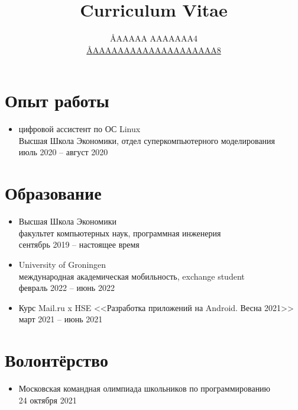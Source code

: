 \documentclass[12pt]{article}
\title{Curriculum Vitae}
\author{\AA{AAAAA AAAAAAA}{4} \\ \href{mailto:\AA{AAAAAAAAAAAAAAAAAAAA}{8}}{\AA{AAAAAAAAAAAAAAAAAAAA}{8}}}
\begin{document}
  \maketitle

  \section{Опыт работы}
  \begin{itemize}
    \item цифровой ассистент по ОС Linux \\
      Высшая Школа Экономики, отдел суперкомпьютерного моделирования \\
      июль 2020 -- август 2020

  \end{itemize}

  \section{Образование}
  \begin{itemize}
    \item Высшая Школа Экономики \\
      факультет компьютерных наук, программная инженерия \\
      сентябрь 2019 -- настоящее время

    \item University of Groningen \\
      международная академическая мобильность, exchange student \\
      февраль 2022 -- июнь 2022

    \item Курс Mail.ru x HSE <<Разработка приложений на Android. Весна 2021>> \\
      март 2021 -- июнь 2021

  \end{itemize}

  \section{Волонтёрство}
  \begin{itemize}
    \item Московская командная олимпиада школьников по программированию \\
      24 октября 2021

  \end{itemize}
\end{document}
